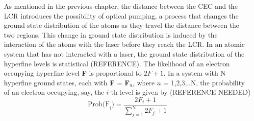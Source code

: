 As mentioned in the previous chapter, the distance between the CEC and the LCR introduces the possibility of optical pumping, a process that changes the ground state distribution of the atoms as they travel the distance between the two regions. This change in ground state distribution is induced by the interaction of the atoms with the laser before they reach the LCR. In an atomic system that has not interacted with a laser, the ground state distribution of the hyperfine levels is statistical (REFERENCE). The likelihood of an electron occupying hyperfine level \textbf{F} is proportional to $2F+1$. In a system with N hyperfine ground states, each with \textbf{F} = \textbf{F}$_n$, where $n$ = 1,2,3,..N, the probability of an electron occupying, say, the $i$-th level is given by (REFERENCE NEEDED)
\begin{equation}
\mathrm{Prob(F}_i) = \frac{2F_i+1}{\sum_{j=1}^\mathrm{N}2F_j+1}
\end{equation}

